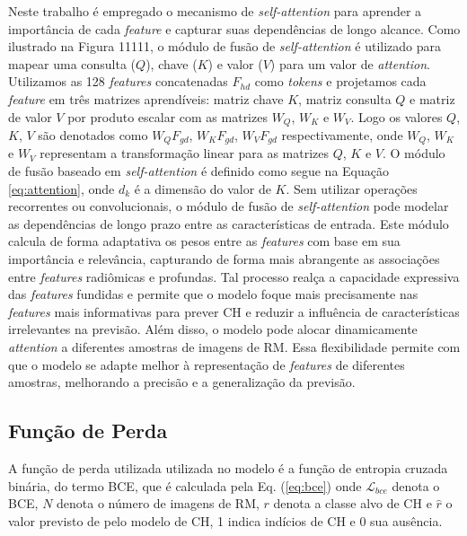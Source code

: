 Neste trabalho é empregado o mecanismo de \textit{self-attention} para aprender a importância de cada \textit{feature} e capturar suas dependências de longo alcance. Como ilustrado na Figura 11111, o módulo de fusão de \textit{self-attention} é utilizado para mapear uma consulta ($Q$), chave ($K$) e valor ($V$) para um valor de \textit{attention}. Utilizamos as 128 \textit{features} concatenadas $F_{hd}$  como \textit{tokens} e projetamos cada \textit{feature} em três matrizes aprendíveis: matriz chave $K$, matriz consulta $Q$ e matriz de valor $V$ por produto escalar com as matrizes $W_{Q}$, $W_{K}$ e $W_{V}$. Logo os valores $Q$, $K$, $V$ são denotados como $W_{Q}F_{gd}$, $W_{K}F_{gd}$, $W_{V}F_{gd}$ respectivamente, onde $W_{Q}$, $W_{K}$ e $W_{V}$ representam a transformação linear para as matrizes $Q$, $K$ e $V$. O módulo de fusão baseado em \textit{self-attention} é definido como segue na Equação \ref{eq:attention}, onde $d_{k}$ é a dimensão do valor de $K$. Sem utilizar operações recorrentes ou convolucionais, o módulo de fusão de \textit{self-attention} pode modelar as dependências de longo prazo entre as características de entrada.      Este módulo calcula de forma adaptativa os pesos entre as \textit{features} com base em sua importância e relevância, capturando de forma mais abrangente as associações entre \textit{features} radiômicas e profundas. Tal processo realça a capacidade expressiva das \textit{features} fundidas e permite que o modelo foque mais precisamente nas \textit{features} mais informativas para prever \gls{CH} e reduzir a influência de características irrelevantes na previsão. Além disso, o modelo pode alocar dinamicamente \textit{attention} a diferentes amostras de imagens de \gls{RM}. Essa flexibilidade permite com que o modelo se adapte melhor à representação de \textit{features} de diferentes amostras, melhorando a precisão e a generalização da previsão.

\subsection{Função de Perda}
\label{subsec:cap4_funcao_perda}

A função de perda utilizada utilizada no modelo é a função de entropia cruzada binária, do termo  \gls{BCE}, que é calculada pela Eq. (\ref{eq:bce}) onde $\mathcal{L}_{bce}$ denota o \gls{BCE}, $N$ denota o número de imagens de \gls{RM}, $r$ denota a classe alvo de \gls{CH} e $\hat{r}$ o valor previsto de pelo modelo de \gls{CH}, 1 indica indícios de \gls{CH} e 0 sua ausência.


